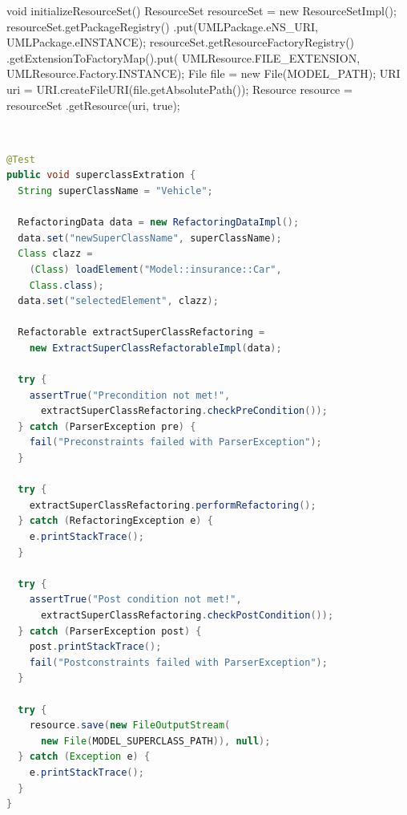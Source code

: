 \documentclass{llncs}
\begin{document}
\begin{lstsingle}[language=Java,caption=Initializing the resourceset,label=lst:resourceset]
void initializeResourceSet() {
  ResourceSet resourceSet = new ResourceSetImpl();
  resourceSet.getPackageRegistry()
    .put(UMLPackage.eNS_URI, UMLPackage.eINSTANCE);
  resourceSet.getResourceFactoryRegistry()
    .getExtensionToFactoryMap().put(
      UMLResource.FILE_EXTENSION, 
      UMLResource.Factory.INSTANCE);
  File file = new File(MODEL_PATH);
  URI uri = URI.createFileURI(file.getAbsolutePath());
  Resource resource = resourceSet
    .getResource(uri, true);
}
\end{lstsingle}
\\

\begin{lstlisting}[language=Java,caption=Execution of the \textit{extract superClass} refactoring as test,label=lst:extractSuperclassTest]
@Test
public void superclassExtration {
  String superClassName = "Vehicle";

  RefactoringData data = new RefactoringDataImpl();
  data.set("newSuperClassName", superClassName);
  Class clazz = 
    (Class) loadElement("Model::insurance::Car", 
    Class.class);
  data.set("selectedElement", clazz);

  Refactorable extractSuperClassRefactoring = 
    new ExtractSuperClassRefactorableImpl(data);

  try {
    assertTrue("Precondition not met!", 
      extractSuperClassRefactoring.checkPreCondition());
  } catch (ParserException pre) {
    fail("Preconstraints failed with ParserException");
  }

  try {
    extractSuperClassRefactoring.performRefactoring();
  } catch (RefactoringException e) {
    e.printStackTrace();
  }

  try {
    assertTrue("Post condition not met!", 
      extractSuperClassRefactoring.checkPostCondition());
  } catch (ParserException post) {
    post.printStackTrace();
    fail("Postconstraints failed with ParserException");
  }

  try {
    resource.save(new FileOutputStream(
      new File(MODEL_SUPERCLASS_PATH)), null);
  } catch (Exception e) {
    e.printStackTrace();
  }
}
\end{lstlisting}
\end{document}
